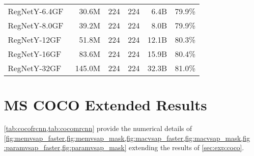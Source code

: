 \documentclass{article}
\begin{document}
\begin{table*}
{\begin{tabular}{lrrrrr}
        RegNetY-6.4GF~\cite{radosavovic2020designing}     &  30.6M &       224 & 224 &  6.4B & 79.9\%  \\
        RegNetY-8.0GF~\cite{radosavovic2020designing}     &  39.2M &       224 & 224 &  8.0B & 79.9\%  \\
        RegNetY-12GF~\cite{radosavovic2020designing}      &  51.8M &       224 & 224 & 12.1B & 80.3\%  \\
        RegNetY-16GF~\cite{radosavovic2020designing}      &  83.6M &       224 & 224 & 15.9B & 80.4\%  \\
        RegNetY-32GF~\cite{radosavovic2020designing}      & 145.0M &       224 & 224 & 32.3B & 81.0\%  \\
        \bottomrule
    \end{tabular}
    }
    \label{tab:i1kacc_ext}
\end{table*}


\section{MS COCO Extended Results}
\label{sec:exp:mscoco_ext_results}

\cref{tab:cocofrcnn,tab:cocomrcnn} provide the numerical details of \cref{fig:memvsap_faster,fig:memvsap_mask,fig:macvsap_faster,fig:macvsap_mask,fig:paramvsap_faster,fig:paramvsap_mask} extending the results of \cref{sec:exp:coco}.
\end{document}
